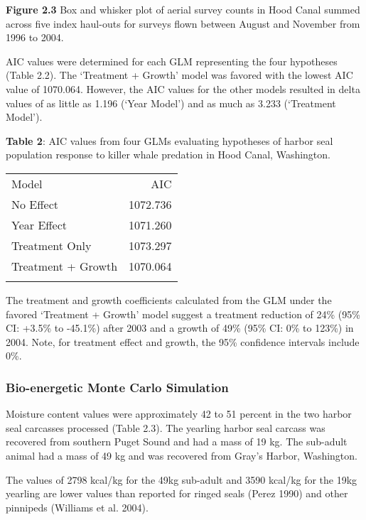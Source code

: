 \textbf{Figure 2.3} Box and whisker plot of aerial survey counts in Hood
Canal summed across five index haul-outs for surveys flown between
August and November from 1996 to 2004.

AIC values were determined for each GLM representing the four hypotheses
(Table 2.2). The `Treatment + Growth' model was favored with the lowest
AIC value of 1070.064. However, the AIC values for the other models
resulted in delta values of as little as 1.196 (`Year Model') and as
much as 3.233 (`Treatment Model').

\textbf{Table 2}: AIC values from four GLMs evaluating hypotheses of
harbor seal population response to killer whale predation in Hood Canal,
Washington.

\begin{longtable}[c]{@{}lr@{}}
\hline\noalign{\medskip}
Model & AIC
\\\noalign{\medskip}
\hline\noalign{\medskip}
No Effect & 1072.736
\\\noalign{\medskip}
Year Effect & 1071.260
\\\noalign{\medskip}
Treatment Only & 1073.297
\\\noalign{\medskip}
Treatment + Growth & 1070.064
\\\noalign{\medskip}
\hline
\end{longtable}

The treatment and growth coefficients calculated from the GLM under the
favored `Treatment + Growth' model suggest a treatment reduction of 24\%
(95\% CI: +3.5\% to -45.1\%) after 2003 and a growth of 49\% (95\% CI:
0\% to 123\%) in 2004. Note, for treatment effect and growth, the 95\%
confidence intervals include 0\%.

\subsubsection{Bio-energetic Monte Carlo
Simulation}\label{bio-energetic-monte-carlo-simulation-1}

Moisture content values were approximately 42 to 51 percent in the two
harbor seal carcasses processed (Table 2.3). The yearling harbor seal
carcass was recovered from southern Puget Sound and had a mass of 19 kg.
The sub-adult animal had a mass of 49 kg and was recovered from Gray's
Harbor, Washington.

The values of 2798 kcal/kg for the 49kg sub-adult and 3590 kcal/kg for
the 19kg yearling are lower values than reported for ringed seals (Perez
1990) and other pinnipeds (Williams et al. 2004).

